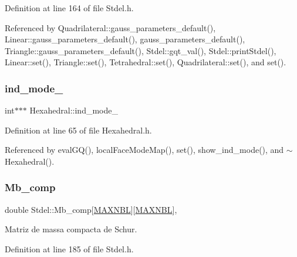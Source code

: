 Definition at line 164 of file Stdel.\+h.



Referenced by Quadrilateral\+::gauss\+\_\+parameters\+\_\+default(), Linear\+::gauss\+\_\+parameters\+\_\+default(), gauss\+\_\+parameters\+\_\+default(), Triangle\+::gauss\+\_\+parameters\+\_\+default(), Stdel\+::gqt\+\_\+val(), Stdel\+::print\+Stdel(), Linear\+::set(), Triangle\+::set(), Tetrahedral\+::set(), Quadrilateral\+::set(), and set().

\mbox{\label{classHexahedral_ab4a2ad7d8c0e9509f8eb0ef64bc44d4c}} 
\subsubsection{\texorpdfstring{ind\+\_\+mode\+\_\+}{ind\_mode\_}}
{\footnotesize\ttfamily int$\ast$$\ast$$\ast$ Hexahedral\+::ind\+\_\+mode\+\_\+\hspace{0.3cm}{\ttfamily [private]}}



Definition at line 65 of file Hexahedral.\+h.



Referenced by eval\+G\+Q(), local\+Face\+Mode\+Map(), set(), show\+\_\+ind\+\_\+mode(), and $\sim$\+Hexahedral().

\mbox{\label{classStdel_aa1627cb39fa5da75764809412159c825}} 
\subsubsection{\texorpdfstring{Mb\+\_\+comp}{Mb\_comp}}
{\footnotesize\ttfamily double Stdel\+::\+Mb\+\_\+comp\mbox{[}\hyperlink{MyOptions_8h_aed8828a63ec0a2a0461b7c9ed39dd648}{M\+A\+X\+N\+BL}\mbox{]}\mbox{[}\hyperlink{MyOptions_8h_aed8828a63ec0a2a0461b7c9ed39dd648}{M\+A\+X\+N\+BL}\mbox{]}\hspace{0.3cm}{\ttfamily [protected]}, {\ttfamily [inherited]}}



Matriz de massa compacta de Schur. 



Definition at line 185 of file Stdel.\+h.



